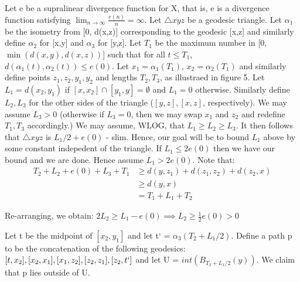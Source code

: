 \documentclass[11pt]{article}
\newcommand{\vs}{\vskip10pt}
\begin{document}
 	Let e be a supralinear divergence function for X, that is, e is a divergence function satisfying $\lim_{n \rightarrow \infty} \frac{e(n)}{n} = \infty$. Let $\triangle xyz$ be a geodesic triangle. Let $\alpha_1$ be the isometry from [0, d(x,z)] corresponding to the geodesic [x,z] and similarly define $\alpha_2$ for [x,y] and $\alpha_3$ for [y,z]. Let $T_1$ be the maximum number in [0, $\min(d(x,y), d(x, z))$] such that for all $t \leq T_1$, $d(\alpha_1(t), \alpha_2(t)) \leq e(0)$. Let $x_1 = \alpha_1(T_1)$, $x_2 = \alpha_2(T_1)$ and similarly define points $z_1, z_2, y_1, y_2$ and lengths $T_2, T_3$, as illustraed in figure 5. 
 	\vs
 	Let $L_1 = d(x_2, y_1)$ if $[x, x_2] \cap [y_1, y] = \emptyset$ and $L_1 = 0$ otherwise. Similarly define $L_2, L_3$ for the other sides of the triangle ($[y,z],[x,z]$, respectively). We may assume $L_3 > 0$ (otherwise if $L_3 = 0$, then we may swap $x_1$ and $z_2$ and redefine $T_1, T_3$ accordingly.)
 	\vs
 	We may assume, WLOG, that $L_1 \geq L_2 \geq L_3$. It then follows that $\triangle xyz$ is $ L_1/2 + e(0)$ - slim. Hence, our goal will be to bound $L_1$ above by some constant indepedent of the triangle. 
 	\vs
 	If $L_1 \leq 2e(0)$ then we have our bound and we are done. Hence assume $L_1 > 2e(0)$. Note that:
 	\vs
 	\begin{align*}
 	T_2 + L_2 + e(0) + L_3 + T_1 &\geq d(y, z_1) + d(z_1, z_2) + d(z_2, x) \\
    &\geq d(y, x) \\
    &= T_1 + L_1 + T_2
 	\end{align*}
 	 
 	 Re-arranging, we obtain: $2L_2 \geq L_1 - e(0) \implies L_2 \geq \frac{1}{2} e(0) > 0$
 	 \vs 
 	 
 	 Let t be the midpoint of $[x_2, y_1]$ and let t` = $\alpha_3 (T_2 + L_1/2)$. Define a path p to be the concatenation of the following geodesics: $[t, x_2], [x_2, x_1], [x_1, z_2], [z_2, z_1],[z_2, t`]$ and let U = $int(B_{T_2 + L_1/2}(y))$. We claim that p lies outside of U. 
 	 \vs
 	 
\end{document}
